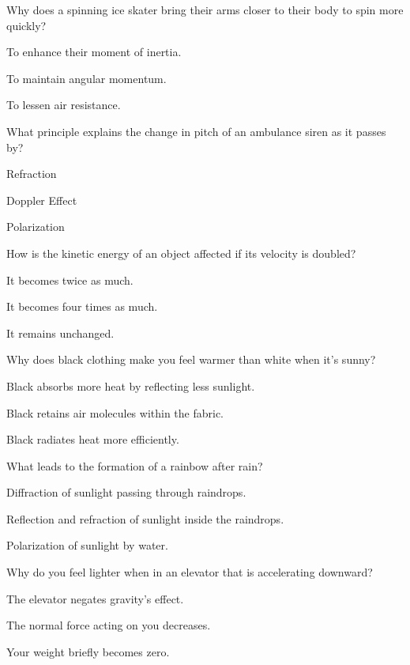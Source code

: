 \begin{enhancedmcq}{Why does a spinning ice skater bring their arms closer to their body to spin more quickly?}
\item To enhance their moment of inertia.
\item To maintain angular momentum.
\item To lessen air resistance.

\end{enhancedmcq}
\begin{enhancedmcq}{What principle explains the change in pitch of an ambulance siren as it passes by?}
\item Refraction
\item Doppler Effect
\item Polarization

\end{enhancedmcq}
\begin{enhancedmcq}{How is the kinetic energy of an object affected if its velocity is doubled?}
\item It becomes twice as much.
\item It becomes four times as much.
\item It remains unchanged.

\end{enhancedmcq}
\begin{enhancedmcq}{Why does black clothing make you feel warmer than white when it's sunny?}
\item Black absorbs more heat by reflecting less sunlight.
\item Black retains air molecules within the fabric.
\item Black radiates heat more efficiently.

\end{enhancedmcq}
\begin{enhancedmcq}{What leads to the formation of a rainbow after rain?}
\item Diffraction of sunlight passing through raindrops.
\item Reflection and refraction of sunlight inside the raindrops.
\item Polarization of sunlight by water.

\end{enhancedmcq}
\begin{enhancedmcq}{Why do you feel lighter when in an elevator that is accelerating downward?}
\item The elevator negates gravity's effect.
\item The normal force acting on you decreases.
\item Your weight briefly becomes zero.

\end{enhancedmcq}
